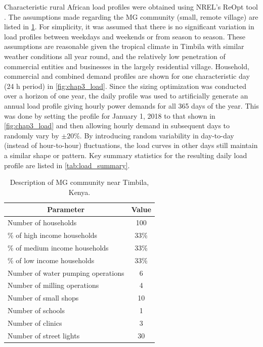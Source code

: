 \documentclass[final,3p,times]{elsarticle}
\begin{document}
Characteristic rural African load profiles were obtained using NREL's ReOpt tool \cite{nrel_data}. The assumptions made regarding the MG community (small, remote village) are listed in \cref{tab:load}. For simplicity, it was assumed that there is no significant variation in load profiles between weekdays and weekends or from season to season. These assumptions are reasonable given the tropical climate in Timbila with similar weather conditions all year round, and the relatively low penetration of commercial entities and businesses in the largely residential village. Household, commercial and combined demand profiles are shown for one characteristic day (24 h period) in \cref{fig:chap3_load}. Since the sizing optimization was conducted over a horizon of one year, the daily profile was used to artificially generate an annual load profile giving hourly power demands for all 365 days of the year. This was done by setting the profile for January 1, 2018 to that shown in \cref{fig:chap3_load} and then allowing hourly demand in subsequent days to randomly vary by $\pm 20\%$. By introducing random variability in day-to-day (instead of hour-to-hour) fluctuations, the load curves in other days still maintain a similar shape or pattern. Key summary statistics for the resulting daily load profile are listed in \cref{tab:load_summary}. 

\begin{table}[htbp] 
\centering
\begin{tabular}{@{}lc@{}}
\toprule
\multicolumn{1}{c}{\textbf{Parameter}} & \textbf{Value}       \\ 
\midrule
Number of households & 100 \\
\% of high income households & 33\% \\
\% of medium income households & 33\% \\
\% of low income households & 33\% \\
Number of water pumping operations & 6 \\
Number of milling operations & 4 \\
Number of small shops & 10 \\
Number of schools & 1 \\
Number of clinics & 3 \\
Number of street lights & 30 \\
\bottomrule
\end{tabular}
\caption{Description of MG community near Timbila, Kenya.}
\label{tab:load}
\end{table}
\end{document}
